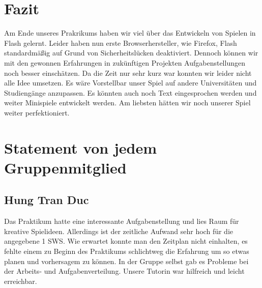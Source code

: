 \documentclass[a4paper, 11pt]{article} %
\begin{document}
\section{Fazit}
Am Ende unseres Prakrikums haben wir viel über das Entwickeln von Spielen in Flash gelernt. Leider haben nun erste Browserhersteller, wie Firefox, Flash standardmäßig auf Grund von Sicherheitslücken deaktiviert. Dennoch können wir mit den gewonnen Erfahrungen in zukünftigen Projekten Aufgabenstellungen noch besser einschätzen. Da die Zeit nur sehr kurz war konnten wir leider nicht alle Idee umsetzen. Es wäre Vorstellbar unser Spiel auf andere Universitäten und Studiengänge anzupassen. Es könnten auch noch Text eingesprochen werden und weiter Minispiele entwickelt werden. Am liebsten hätten wir noch unserer Spiel weiter perfektioniert.

\section{Statement von jedem Gruppenmitglied}
\subsection{Hung Tran Duc}
Das Praktikum hatte eine interessante Aufgabenstellung und lies Raum für kreative Spielideen.
Allerdings ist der zeitliche Aufwand sehr hoch für die angegebene 1 SWS.
Wie erwartet konnte man den Zeitplan nicht einhalten, es fehlte einem zu Beginn des Praktikums schlichtweg 
die Erfahrung um so etwas planen und vorhersagem zu können.
In der Gruppe selbst gab es Probleme bei der Arbeits- und Aufgabenverteilung.
Unsere Tutorin war hilfreich und leicht erreichbar.
\end{document}
